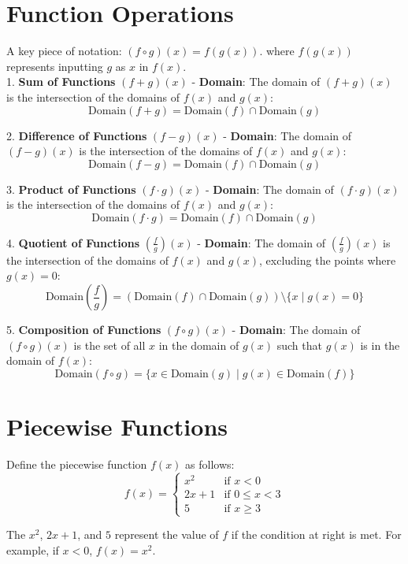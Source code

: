 \documentclass[12pt]{article}
\begin{document}
\section{Function Operations}

A key piece of notation: \((f \circ g)(x)=f(g(x))\). where \(f(g(x))\) represents inputting \(g\) as \(x\) in \(f(x)\).\\ 

1. \textbf{Sum of Functions} \( (f + g)(x) \)
   - \textbf{Domain}: The domain of \( (f + g)(x) \) is the intersection of the domains of \( f(x) \) and \( g(x) \):
     \[
     \text{Domain}(f + g) = \text{Domain}(f) \cap \text{Domain}(g)
     \]

2. \textbf{Difference of Functions} \( (f - g)(x) \)
   - \textbf{Domain}: The domain of \( (f - g)(x) \) is the intersection of the domains of \( f(x) \) and \( g(x) \):
     \[
     \text{Domain}(f - g) = \text{Domain}(f) \cap \text{Domain}(g)
     \]

3. \textbf{Product of Functions} \( (f \cdot g)(x) \)
   - \textbf{Domain}: The domain of \( (f \cdot g)(x) \) is the intersection of the domains of \( f(x) \) and \( g(x) \):
     \[
     \text{Domain}(f \cdot g) = \text{Domain}(f) \cap \text{Domain}(g)
     \]

4. \textbf{Quotient of Functions} \( \left( \frac{f}{g} \right)(x) \)
   - \textbf{Domain}: The domain of \( \left( \frac{f}{g} \right)(x) \) is the intersection of the domains of \( f(x) \) and \( g(x) \), excluding the points where \( g(x) = 0 \):
     \[
     \text{Domain}\left( \frac{f}{g} \right) = \left( \text{Domain}(f) \cap \text{Domain}(g) \right) \setminus \{ x \mid g(x) = 0 \}
     \]

5. \textbf{Composition of Functions} \( (f \circ g)(x) \)
   - \textbf{Domain}: The domain of \( (f \circ g)(x) \) is the set of all \( x \) in the domain of \( g(x) \) such that \( g(x) \) is in the domain of \( f(x) \):
     \[
     \text{Domain}(f \circ g) = \{ x \in \text{Domain}(g) \mid g(x) \in \text{Domain}(f) \}
     \]
     
\section{Piecewise Functions}

Define the piecewise function \( f(x) \) as follows:
\[
f(x) =
\begin{cases}
x^2 & \text{if } x < 0 \\
2x + 1 & \text{if } 0 \leq x < 3 \\
5 & \text{if } x \geq 3
\end{cases}
\]



The \(x^{2}\), \(2x+1\), and \(5\) represent the value of \(f\) if the condition at right is met. For example, if \(x<0\), \(f(x)=x^{2}\).\\
\end{document}
